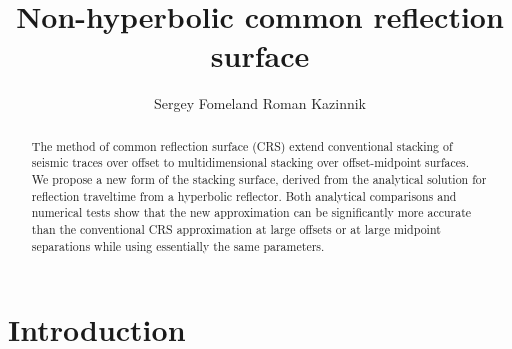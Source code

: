 

\renewcommand{\thefootnote}{\fnsymbol{footnote}}

\title{Non-hyperbolic common reflection surface}
\author{Sergey Fomel\footnotemark[1] and Roman Kazinnik\footnotemark[1]\footnotemark[2]}

\address{
\footnotemark[1]Bureau of Economic Geology \\
John A. and Katherine G. Jackson School of Geosciences \\
The University of Texas at Austin \\
University Station, Box X \\
Austin, TX 78713-8924 \\
USA \\
sergey.fomel@beg.utexas.edu \\
\footnotemark[2]Currently ConocoPhillips \\
600 N. Dairy Ashford \\
Houston, TX 77079-1175 \\
USA \\
roman.only@gmail.com
}

\maketitle

\newpage

\begin{abstract}
  The method of common reflection surface (CRS) extend conventional
  stacking of seismic traces over offset to multidimensional stacking
  over offset-midpoint surfaces. We propose a new form of the stacking
  surface, derived from the analytical solution for reflection
  traveltime from a hyperbolic reflector. Both analytical comparisons
  and numerical tests show that the new approximation can be
  significantly more accurate than the conventional CRS approximation
  at large offsets or at large midpoint separations while using
  essentially the same parameters.
\end{abstract}

\section{Introduction}

